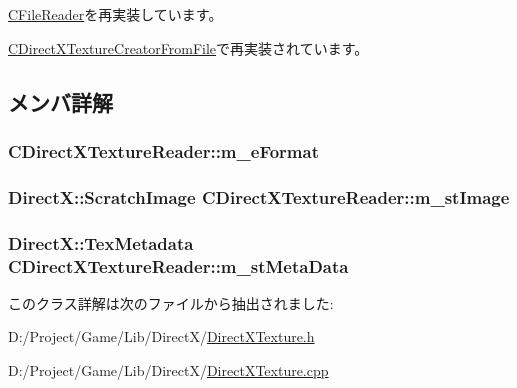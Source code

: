 \hyperlink{class_c_file_reader_a5a18550133826ac43096629f6eaa8c42}{C\+File\+Reader}を再実装しています。



\hyperlink{class_c_direct_x_texture_creator_from_file_a5358c62c1a9b7154b17e64d480fa140c}{C\+Direct\+X\+Texture\+Creator\+From\+File}で再実装されています。



\subsection{メンバ詳解}
\hypertarget{class_c_direct_x_texture_reader_ac09d73093277f3f444eee39b827fe92c}{}
\subsubsection[{m\+\_\+e\+Format}]{ C\+Direct\+X\+Texture\+Reader\+::m\+\_\+e\+Format\hspace{0.3cm}{\ttfamily [private]}}\label{class_c_direct_x_texture_reader_ac09d73093277f3f444eee39b827fe92c}
\hypertarget{class_c_direct_x_texture_reader_a3e34a721e8e70a5bf417199c7a5f568b}{}
\subsubsection[{m\+\_\+st\+Image}]{\setlength{\rightskip}{0pt plus 5cm}Direct\+X\+::\+Scratch\+Image C\+Direct\+X\+Texture\+Reader\+::m\+\_\+st\+Image\hspace{0.3cm}{\ttfamily [private]}}\label{class_c_direct_x_texture_reader_a3e34a721e8e70a5bf417199c7a5f568b}
\hypertarget{class_c_direct_x_texture_reader_a2588eec0104869cb09dd43d9ab2ac024}{}
\subsubsection[{m\+\_\+st\+Meta\+Data}]{\setlength{\rightskip}{0pt plus 5cm}Direct\+X\+::\+Tex\+Metadata C\+Direct\+X\+Texture\+Reader\+::m\+\_\+st\+Meta\+Data\hspace{0.3cm}{\ttfamily [private]}}\label{class_c_direct_x_texture_reader_a2588eec0104869cb09dd43d9ab2ac024}


このクラス詳解は次のファイルから抽出されました\+:\begin{DoxyCompactItemize}
\item 
D\+:/\+Project/\+Game/\+Lib/\+Direct\+X/\hyperlink{_direct_x_texture_8h}{Direct\+X\+Texture.\+h}\item 
D\+:/\+Project/\+Game/\+Lib/\+Direct\+X/\hyperlink{_direct_x_texture_8cpp}{Direct\+X\+Texture.\+cpp}\end{DoxyCompactItemize}

